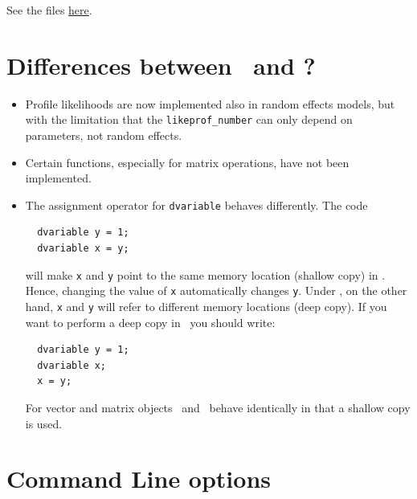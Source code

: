 \documentclass{admbmanual}
\begin{document}
See the files \href{http://admb-project.org/community/tutorials-and-examples/%
random-effects-example-collection/%
item-response-theory-irt-and-the-multilevel-rasch-model-1}{here}.

\chapter{Differences between \scAB\ and \scAR?}

\begin{itemize}
  \item Profile likelihoods are now implemented also in random effects models,
  but with the limitation that the \texttt{likeprof\_number} can only depend on
  parameters, not random effects.
  \item Certain functions, especially for matrix operations, have not been
  implemented.
  \item The assignment operator for \texttt{dvariable} behaves differently. The
  code
  \begin{lstlisting}
  dvariable y = 1;
  dvariable x = y;
  \end{lstlisting}
  will make \texttt{x} and \texttt{y} point to the same memory location (shallow
  copy) in \scAR. Hence, changing the value of \texttt{x} automatically changes
  \texttt{y}. Under \scAB, on the other hand, \texttt{x} and \texttt{y} will
  refer to different memory locations (deep copy). If you want to perform a deep
  copy in \scAR\ you should write:
  \begin{lstlisting}
  dvariable y = 1;
  dvariable x;
  x = y;
\end{lstlisting}
  For vector and matrix objects \scAB\ and \scAR\ behave identically in that
  a shallow copy is used.
\end{itemize}

\chapter{Command Line options}
\label{sec:command_line_options}
\end{document}
